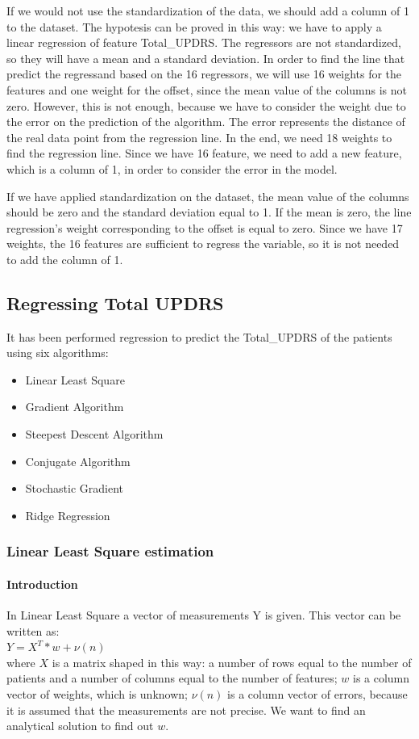 \documentclass[12pt,a4paper,oneside]{article}
\begin{document}
	If we would not use the standardization of the data, we should add a column of 1 to the dataset. The hypotesis can be proved in this way: we have to apply a linear regression of feature Total\_UPDRS. The regressors are not standardized, so they will have a mean and a standard deviation. In order to find the line that predict the regressand based on the 16 regressors, we will use 16 weights for the features and one weight for the offset, since the mean value of the columns is not zero. However, this is not enough, because we have to consider the weight due to the error on the prediction of the algorithm. The error represents the distance of the real data point from the regression line. In the end, we need 18 weights to find the regression line. Since we have 16 feature, we need to add a new feature, which is a column of 1, in order to consider the error in the model.
	
	If we have applied standardization on the dataset, the mean value of the columns should be zero and the standard deviation equal to 1. If the mean is zero, the line regression's weight corresponding to the offset is equal to zero. Since we have 17 weights, the 16 features are sufficient to regress the variable, so it is not needed to add the column of 1.
	
	\subsection{Regressing Total UPDRS}
	It has been performed regression to predict the Total\_UPDRS of the patients using six algorithms:
		\begin{itemize}
			\item Linear Least Square
			\item Gradient Algorithm
			\item Steepest Descent Algorithm
			\item Conjugate Algorithm
			\item Stochastic Gradient 
			\item Ridge Regression
		\end{itemize}
	
	\subsubsection{Linear Least Square estimation}
	\paragraph{Introduction}In Linear Least Square a vector of measurements Y is given. This vector can be written as:\\  $Y=X^{T}*w+\nu(n)$ \\
	where $X$ is a matrix shaped in this way: a number of rows equal to the number of patients and a number of columns equal to the number of features; $w$ is a column vector of weights, which is unknown; $\nu(n)$ is a column vector of errors, because it is assumed that the measurements are not precise. We want to find an analytical solution to find out $w$.
	
\end{document}
